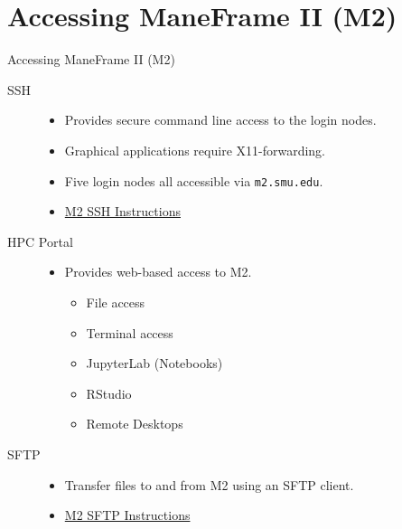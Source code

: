 \section{Accessing ManeFrame II (M2)}

\begin{frame}{Accessing ManeFrame II (M2)}
\begin{description}
\item[SSH]
\begin{itemize}
  \item Provides secure command line access to the login nodes.
  \item Graphical applications require X11-forwarding.
  \item Five login nodes all accessible via \texttt{m2.smu.edu}.
  \item \href{https://s2.smu.edu/hpc/documentation/access.html}{M2 SSH Instructions}
\end{itemize}
\item[HPC Portal]
\begin{itemize}
  \item Provides web-based access to M2.
  \begin{itemize}
    \item File access
    \item Terminal access
    \item JupyterLab (Notebooks)
    \item RStudio
    \item Remote Desktops
  \end{itemize}
\end{itemize}
\item[SFTP]
\begin{itemize}
  \item Transfer files to and from M2 using an SFTP client.
  \item \href{https://s2.smu.edu/hpc/documentation/access.html}{M2 SFTP Instructions}
\end{itemize}
\end{description}
\end{frame}

